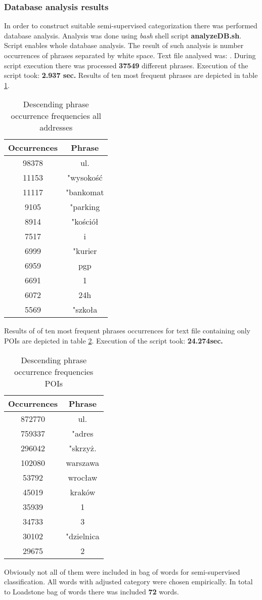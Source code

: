 \subsubsection{Database analysis results}
In order to construct suitable semi-supervised categorization there was performed database analysis. Analysis was done using \textit{bash} shell script \textbf{analyzeDB.sh}. Script enables whole database analysis. The result of such analysis is number occurrences of phrases separated by white space. Text file analysed was: \cite{29}. During script execution there was processed \textbf{37549} different phrases. Execution of the script took: \textbf{2.937 sec.} Results of ten most frequent phrases are depicted in table \ref{tab1}.
\begin{table}[H]
	\centering
	\begin{tabular}{ | c | c |}
		\hline
		Occurrences & Phrase\tabularnewline \hline
		98378 & ul.	\\
		11153 & "wysokość\\
		11117 & "bankomat\\
		9105  & "parking\\
		8914  & "kościół\\
		7517  & i\\
		6999  & "kurier\\
		6959  & pgp\\
		6691  & 1 \\
		6072  & 24h\\
		5569  & "szkoła\\		
		\hline
	\end{tabular}
	\caption{Descending phrase occurrence frequencies all addresses}
	\label{tab1}
\end{table}
Results of of ten most frequent phrases occurrences for text file containing only POIs are depicted in table \ref{tab2}. Execution of the script took: \textbf{24.274sec.}
\begin{table}[H]
	\centering
	\begin{tabular}{ | c | c |}
		\hline
		Occurrences & Phrase\\ \hline		
		872770& ul.\\
		759337& "adres\\
		296042& "skrzyż.\\
		102080& warszawa\\
		53792& wrocław\\
		45019& kraków\\
		35939& 1\\
		34733& 3\\
		30102& "dzielnica\\
		29675& 2	\\	
		\hline
	\end{tabular}
	\caption{Descending phrase occurrence frequencies POIs}
	\label{tab2}
\end{table}
Obviously not all of them were included in bag of words for semi-supervised classification. All words with adjusted category were chosen empirically. In total to Loadstone bag of words there was included \textbf{72} words.

